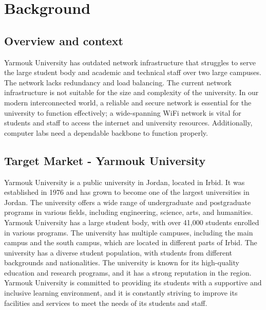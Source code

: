 \documentclass[12pt]{report}
\begin{document}

\chapter{Background}
\section{Overview and context}

Yarmouk University has outdated network infrastructure that struggles to serve the large student body and academic and technical staff over two large campuses. The network lacks redundancy and load balancing. The current network infrastructure is not suitable for the size and complexity of the university. In our modern interconnected world, a reliable and secure network is essential for the university to function effectively; a wide-spanning WiFi network is vital for students and staff to access the internet and university resources. Additionally, computer labs need a dependable backbone to function properly.
\section{Target Market - Yarmouk University}
Yarmouk University is a public university in Jordan, located in Irbid. It was established in 1976 and has grown to become one of the largest universities in Jordan. The university offers a wide range of undergraduate and postgraduate programs in various fields, including engineering, science, arts, and humanities. Yarmouk University has a large student body, with over 41,000 students enrolled in various programs. The university has multiple campuses, including the main campus and the south campus, which are located in different parts of Irbid. The university has a diverse student population, with students from different backgrounds and nationalities. The university is known for its high-quality education and research programs, and it has a strong reputation in the region. Yarmouk University is committed to providing its students with a supportive and inclusive learning environment, and it is constantly striving to improve its facilities and services to meet the needs of its students and staff. \cite{YU}
\end{document}
